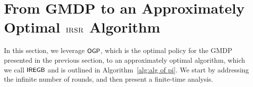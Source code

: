 




\section{From GMDP to an Approximately Optimal $\textsc{IRSR}$ Algorithm}\label{sec:policy to algorithm}
In this section, we leverage ${\small\textnormal{\textsf{OGP}}}$, which is the optimal policy for the GMDP presented in the previous section, to an approximately optimal algorithm, which we call ${\small\textnormal{\textsf{IREGB}}}$ and is outlined in Algorithm~\ref{alg:alg of pi}. We start by addressing the infinite number of rounds, and then present a finite-time analysis. %

